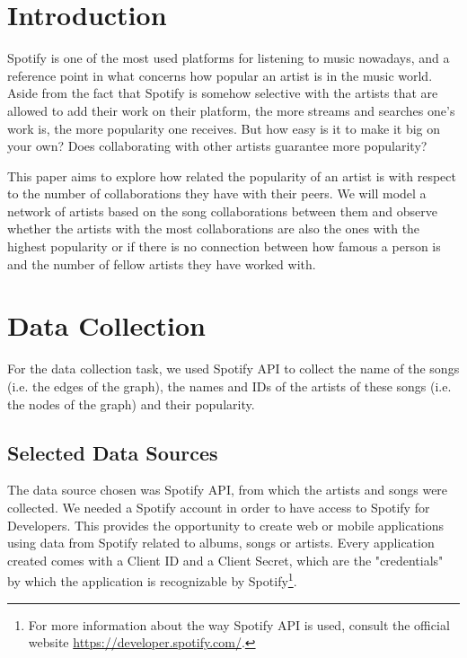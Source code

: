 \documentclass[sigchi]{acmart}
\begin{document}
%


%
\maketitle

\section{Introduction}
Spotify is one of the most used platforms for listening to music nowadays, and a reference point in what concerns how popular an artist is in the music world. Aside from the fact that Spotify is somehow selective with the artists that are allowed to add their work on their platform, the more streams and searches one's work is, the more popularity one receives. But how easy is it to make it big on your own? Does collaborating with other artists guarantee more popularity?

This paper aims to explore how related the popularity of an artist is with respect to the number of collaborations they have with their peers. We will model a network of artists based on the song collaborations between them and observe whether the artists with the most collaborations are also the ones with the highest popularity or if there is no connection between how famous a person is and the number of fellow artists they have worked with.

\section{Data Collection}
For the data collection task, we used Spotify API to collect the name of the songs (i.e. the edges of the graph), the names and IDs of the artists of these songs (i.e. the nodes of the graph) and their popularity. 

\subsection{Selected Data Sources}

The data source chosen was Spotify API, from which the artists and songs were collected. We needed a Spotify account in order to have access to Spotify for Developers. This provides the opportunity to create web or mobile applications using data from Spotify related to albums, songs or artists. Every application created comes with a Client ID and a Client Secret, which are the "credentials" by which the application is recognizable by Spotify\footnote{For more information about the way Spotify API is used, consult the official website \url{https://developer.spotify.com/}.}.
\end{document}
